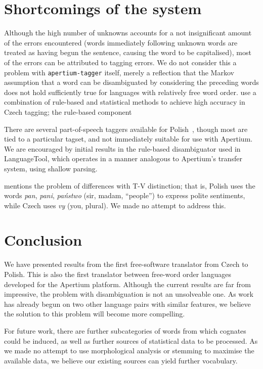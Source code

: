 \documentclass[11pt]{article}
\begin{document}
\section{Shortcomings of the system}

Although the high number of unknowns accounts for a not insignificant amount
of the errors encountered (words immediately following unknown words are treated
as having begun the sentence, causing the word to be capitalised),
most of the errors can be attributed to tagging errors. We do not consider this a problem
with {\tt\small apertium-tagger} itself, merely a reflection that the Markov
assumption that a word can be disambiguated by considering the preceding words 
does not hold sufficiently true for languages with relatively free word order.
\cite{Hajic_serial} use a combination of rule-based and statistical methods
to achieve high accuracy in Czech tagging; the rule-based component 

There are several part-of-speech taggers available for Polish~\citep{Piasecki:07TQ, Acedanski09}, 
though most are tied to a particular tagset, and not immediately suitable for use
with Apertium. We are encouraged by initial results in the rule-based 
disambiguator used in LanguageTool, which operates in a manner analogous to
Apertium's transfer system, using shallow parsing.

\cite{Debowski02} mentions the problem of differences with T-V distinction; that is,
Polish uses the words \emph{pan}, \emph{pani}, \emph{państwo} (sir, madam, ``people'')
to express polite sentiments, while Czech uses \emph{vy} (you, plural). We made no
attempt to address this.

\section{Conclusion}

We have presented results from the first free-software translator from Czech to 
Polish. This is also the first translator between free-word order languages
developed for the Apertium platform. Although the current results are far from
impressive, the problem with disambiguation is not an unsolveable one. As
work has already begun on two other language pairs with similar features, we
believe the solution to this problem will become more compelling.

For future work, there are further subcategories of words from which cognates
could be induced, as well as further sources of statistical data to be
processed. As we made no attempt to use morphological analysis or stemming
to maximise the available data, we believe our existing sources can yield
further vocabulary.
\end{document}
